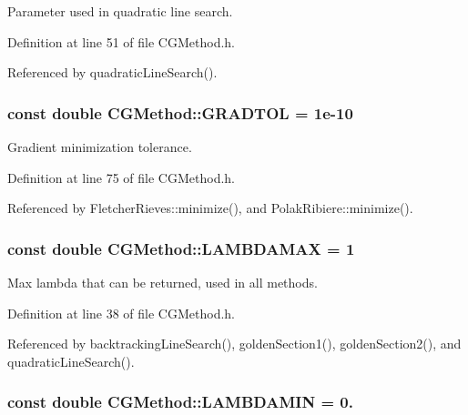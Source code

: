 Parameter used in quadratic line search. 



Definition at line 51 of file C\+G\+Method.\+h.



Referenced by quadratic\+Line\+Search().

\hypertarget{classCGMethod_ad0118dc4da7526f196a4b4172bba9625}{
\subsubsection[{G\+R\+A\+D\+T\+O\+L}]{\setlength{\rightskip}{0pt plus 5cm}const double C\+G\+Method\+::\+G\+R\+A\+D\+T\+O\+L = 1e-\/10\hspace{0.3cm}{\ttfamily [protected]}}}\label{classCGMethod_ad0118dc4da7526f196a4b4172bba9625}


Gradient minimization tolerance. 



Definition at line 75 of file C\+G\+Method.\+h.



Referenced by Fletcher\+Rieves\+::minimize(), and Polak\+Ribiere\+::minimize().

\hypertarget{classCGMethod_a04127fd877e82fdf4f71cd3709581419}{
\subsubsection[{L\+A\+M\+B\+D\+A\+M\+A\+X}]{\setlength{\rightskip}{0pt plus 5cm}const double C\+G\+Method\+::\+L\+A\+M\+B\+D\+A\+M\+A\+X = 1\hspace{0.3cm}{\ttfamily [protected]}}}\label{classCGMethod_a04127fd877e82fdf4f71cd3709581419}


Max lambda that can be returned, used in all methods. 



Definition at line 38 of file C\+G\+Method.\+h.



Referenced by backtracking\+Line\+Search(), golden\+Section1(), golden\+Section2(), and quadratic\+Line\+Search().

\hypertarget{classCGMethod_ae28b20ab18f9a0b7c6a1c443add1026e}{
\subsubsection[{L\+A\+M\+B\+D\+A\+M\+I\+N}]{\setlength{\rightskip}{0pt plus 5cm}const double C\+G\+Method\+::\+L\+A\+M\+B\+D\+A\+M\+I\+N = 0.\hspace{0.3cm}{\ttfamily [protected]}}}\label{classCGMethod_ae28b20ab18f9a0b7c6a1c443add1026e}


